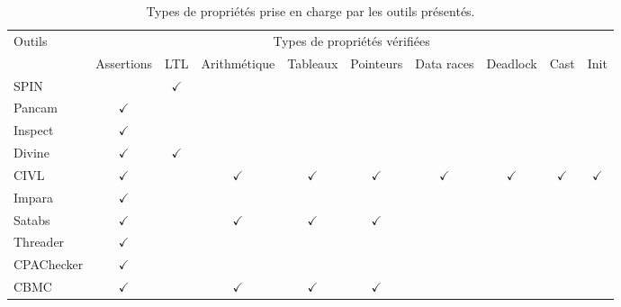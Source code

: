 \begin{landscape}
\begin{table}[ht]
\centering
\caption{Types de propriétés prise en charge par les outils présentés.}
\begin{tabular}{|l|c|c|c|c|c|c|c|c|c|}
\hline
Outils     & \multicolumn{9}{c|}{Types de propriétés vérifiées}                                                                                                     \\
           & Assertions   &      LTL     & Arithmétique &     Tableaux & Pointeurs    & Data races   & Deadlock     & Cast         & Init           \\ \hline
SPIN       &              & $\checkmark$   &                     &                    &              &              &              &              &                \\
Pancam     & $\checkmark$ &              &              &              &              &              &              &              &                \\
Inspect    & $\checkmark$ &              &              &              &              &              &              &              &                \\
Divine     & $\checkmark$ & $\checkmark$ &              &              &              &              &              &              &                \\
CIVL       & $\checkmark$ &              & $\checkmark$ & $\checkmark$ & $\checkmark$ & $\checkmark$ & $\checkmark$ & $\checkmark$ & $\checkmark$   \\
Impara     & $\checkmark$ &              &              &              &              &              &              &              &                \\
Satabs     & $\checkmark$ &              & $\checkmark$ & $\checkmark$ & $\checkmark$ &              &              &              &                \\
Threader   & $\checkmark$ &              &              &              &              &              &              &              &                \\
CPAChecker & $\checkmark$ &              &              &              &              &              &              &              &                \\
CBMC       & $\checkmark$ &              & $\checkmark$ & $\checkmark$ & $\checkmark$ &              &              &              &                \\

\end{tabular}
\end{table}
\end{landscape}
